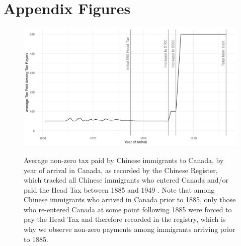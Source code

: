 
\appendix 
\section{Appendix Figures}
\renewcommand{\thefigure}{A\arabic{figure}}
\setcounter{figure}{0}

\begin{figure}[!h]
    \centering 
    \caption{Average non-zero tax paid by Chinese immigrants to Canada, by year of arrival in Canada, as recorded by the Chinese Register, which tracked all Chinese immigrants who entered Canada and/or paid the Head Tax between 1885 and 1949 \citep{chineseregister}. Note that among Chinese immigrants who arrived in Canada prior to 1885, only those who re-entered Canada at some point following 1885 were forced to pay the Head Tax and therefore recorded in the registry, which is why we observe non-zero payments among immigrants arriving prior to 1885.}
    \includegraphics[width=\textwidth]{../../figs/fig1_taxespaid.png}
    \label{fig:taxpaid}
\end{figure}
\newpage 





